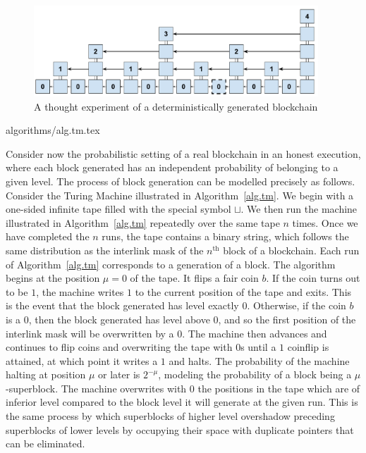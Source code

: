 \begin{figure}[h]
\begin{center}
  \includegraphics[width=0.95\textwidth]{figures/deterministic-superblocks.pdf}
  \caption{A thought experiment of a deterministically generated blockchain}
  \label{fig.deterministic}
  \end{center}
\end{figure}

{algorithms/alg.tm.tex}

Consider now the probabilistic setting of a real blockchain in an honest execution, where each block
generated has an independent probability of belonging to a given level. The
process of block generation can be modelled precisely as follows. Consider the
Turing Machine illustrated in Algorithm~\ref{alg.tm}. We begin with a one-sided
infinite tape filled with the special symbol $\sqcup$. We then run the machine
illustrated in Algorithm~\ref{alg.tm} repeatedly over the same tape $n$ times.
Once we have completed the $n$ runs, the tape contains a binary string, which
follows the same distribution as the interlink mask of the $n^\text{th}$ block
of a blockchain. Each run of Algorithm~\ref{alg.tm} corresponds to a generation
of a block. The algorithm begins at the position $\mu = 0$ of the tape. It flips
a fair coin $b$. If the coin turns out to be $1$, the machine writes $1$ to the
current position of the tape and exits. This is the event that the block
generated has level exactly $0$. Otherwise, if the coin $b$ is a $0$, then the
block generated has level above $0$, and so the first position of the interlink
mask will be overwritten by a $0$. The machine then advances and
continues to flip coins and overwriting the tape with $0$s until a $1$ coinflip
is attained, at which point it writes a $1$ and halts. The probability of the
machine halting at position $\mu$ or later is $2^{-\mu}$, modeling the
probability of a block being a $\mu$-superblock. The machine overwrites with $0$
the positions in the tape which are of inferior level compared to the block
level it will generate at the given run. This is the same process by which
superblocks of higher level overshadow preceding superblocks of lower levels by
occupying their space with duplicate pointers that can be eliminated.

